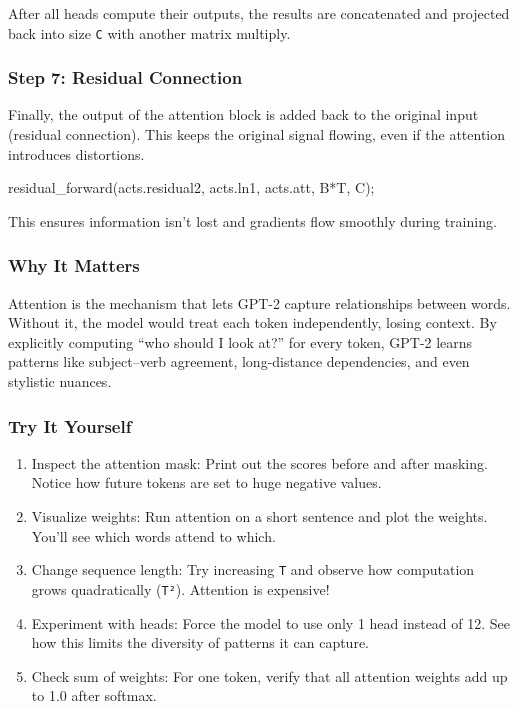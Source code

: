 \documentclass[
  letterpaper,
  DIV=11,
  numbers=noendperiod]{scrreprt}
\newenvironment{Shaded}{\begin{snugshade}}{\end{snugshade}}
\newcommand{\NormalTok}[1]{\textcolor[rgb]{0.00,0.23,0.31}{#1}}
\newcommand{\OperatorTok}[1]{\textcolor[rgb]{0.37,0.37,0.37}{#1}}
\providecommand{\tightlist}{%
  \setlength{\itemsep}{0pt}\setlength{\parskip}{0pt}}
\begin{document}
After all heads compute their outputs, the results are concatenated and
projected back into size \texttt{C} with another matrix multiply.

\subsubsection{Step 7: Residual
Connection}\label{step-7-residual-connection}

Finally, the output of the attention block is added back to the original
input (residual connection). This keeps the original signal flowing,
even if the attention introduces distortions.

\begin{Shaded}
\begin{Highlighting}[]
\NormalTok{residual\_forward}\OperatorTok{(}\NormalTok{acts}\OperatorTok{.}\NormalTok{residual2}\OperatorTok{,}\NormalTok{ acts}\OperatorTok{.}\NormalTok{ln1}\OperatorTok{,}\NormalTok{ acts}\OperatorTok{.}\NormalTok{att}\OperatorTok{,}\NormalTok{ B}\OperatorTok{*}\NormalTok{T}\OperatorTok{,}\NormalTok{ C}\OperatorTok{);}
\end{Highlighting}
\end{Shaded}

This ensures information isn't lost and gradients flow smoothly during
training.

\subsubsection{Why It Matters}\label{why-it-matters-20}

Attention is the mechanism that lets GPT-2 capture relationships between
words. Without it, the model would treat each token independently,
losing context. By explicitly computing ``who should I look at?'' for
every token, GPT-2 learns patterns like subject--verb agreement,
long-distance dependencies, and even stylistic nuances.

\subsubsection{Try It Yourself}\label{try-it-yourself-22}

\begin{enumerate}
\def\labelenumi{\arabic{enumi}.}
\tightlist
\item
  Inspect the attention mask: Print out the scores before and after
  masking. Notice how future tokens are set to huge negative values.
\item
  Visualize weights: Run attention on a short sentence and plot the
  weights. You'll see which words attend to which.
\item
  Change sequence length: Try increasing \texttt{T} and observe how
  computation grows quadratically (\texttt{T²}). Attention is expensive!
\item
  Experiment with heads: Force the model to use only 1 head instead of
  12. See how this limits the diversity of patterns it can capture.
\item
  Check sum of weights: For one token, verify that all attention weights
  add up to 1.0 after softmax.
\end{enumerate}
\end{document}
